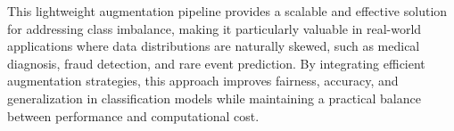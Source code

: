 This lightweight augmentation pipeline provides a scalable and effective solution for addressing class imbalance, making it particularly valuable in real-world applications where data distributions are naturally skewed, such as medical diagnosis, fraud detection, and rare event prediction. By integrating efficient augmentation strategies, this approach improves fairness, accuracy, and generalization in classification models while maintaining a practical balance between performance and computational cost.



